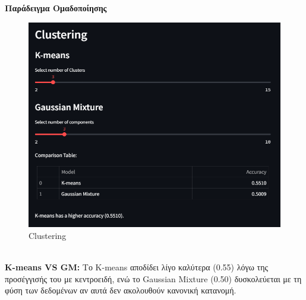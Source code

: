 \documentclass{article}
\begin{document}
{{{{{{\newpage
\textbf{Παράδειγμα Ομαδοποίησης}
\begin{figure}[h!]
  \centering
  \includegraphics[width=0.6\textheight]{photos/clustering.png}
  \caption{Clustering}
  \label{fig:Clustering}
\end{figure} \\
\textbf{K-means VS GM:} Το K-means αποδίδει λίγο καλύτερα (0.55) λόγω της προσέγγισής του με κεντροειδή, ενώ το Gaussian Mixture (0.50) δυσκολεύεται με τη φύση των δεδομένων αν αυτά δεν ακολουθούν κανονική κατανομή.

\newpage
}}}}}}
\end{document}
